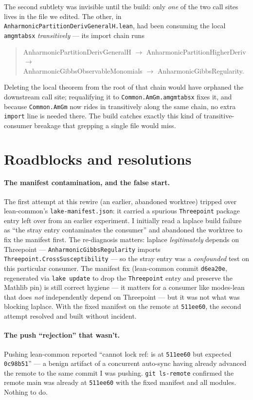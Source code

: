 \documentclass[11pt]{article}
\renewcommand{\_}{\textunderscore\allowbreak}
\begin{document}
The second subtlety was invisible until the build: only \emph{one} of the two
call sites lives in the file we edited. The other, in
\texttt{AnharmonicPartitionDerivGeneralH.lean}, had been consuming the local
\texttt{amgm\_t\_abs\_x} \emph{transitively} --- its import chain runs
\begin{quote}
  \ttfamily\small AnharmonicPartitionDerivGeneralH \(\to\)
  AnharmonicPartitionHigherDeriv \(\to\)\\
  AnharmonicGibbsObservableMonomials \(\to\) AnharmonicGibbsRegularity.
\end{quote}
Deleting the local theorem from the root of
that chain would have orphaned the downstream call site; requalifying it to
\texttt{Common.AmGm.amgm\_t\_abs\_x} fixes it, and because \texttt{Common.AmGm}
now rides in transitively along the same chain, no extra \texttt{import} line is
needed there. The build catches exactly this kind of transitive-consumer
breakage that grepping a single file would miss.

\section{Roadblocks and resolutions}

\paragraph{The manifest contamination, and the false start.} The first attempt
at this rewire (an earlier, abandoned worktree) tripped over lean-common's
\texttt{lake-manifest.json}: it carried a spurious \texttt{Threepoint} package
entry left over from an earlier experiment. I initially read a laplace build
failure as ``the stray entry contaminates the consumer'' and abandoned the
worktree to fix the manifest first. The re-diagnosis matters: laplace
\emph{legitimately} depends on Threepoint --- \texttt{AnharmonicGibbsRegularity}
imports \texttt{Threepoint.CrossSusceptibility} --- so the stray entry was a
\emph{confounded} test on this particular consumer. The manifest fix (lean-common
commit \texttt{d6ea20e}, regenerated via \texttt{lake update} to drop the
\texttt{Threepoint} entry and preserve the Mathlib pin) is still correct hygiene
--- it matters for a consumer like modes-lean that does \emph{not} independently
depend on Threepoint --- but it was not what was blocking laplace. With the fixed
manifest on the remote at \texttt{511ee60}, the second attempt resolved and built
without incident.

\paragraph{The push ``rejection'' that wasn't.} Pushing lean-common reported
``cannot lock ref: is at \texttt{511ee60} but expected \texttt{0c98b51}'' --- a
benign artifact of a concurrent auto-sync having already advanced the remote to
the same commit I was pushing. \texttt{git ls-remote} confirmed the remote main
was already at \texttt{511ee60} with the fixed manifest and all modules. Nothing
to do.
\end{document}
